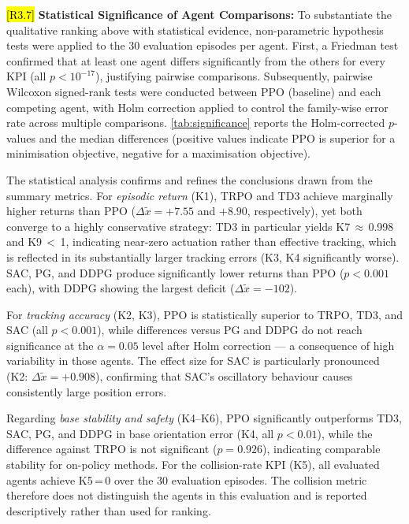 \documentclass{ieeeaccess}
\newcommand{\hlthree}[1]{{\sethlcolor{rthree}\hl{#1}}}
\newenvironment{rthreehl}
  {\def\FrameCommand{\colorbox{rthree}}\MakeFramed{\advance\hsize-\width\FrameRestore}}
  {\endMakeFramed}
\begin{document}
\begin{rthreehl}
\hlthree{[R3.7]} \textbf{Statistical Significance of Agent Comparisons:}
To substantiate the qualitative ranking above with statistical evidence, non-parametric
hypothesis tests were applied to the 30 evaluation episodes per agent.
First, a Friedman test confirmed that at least one agent differs significantly from the others for
every KPI (all $p < 10^{-17}$), justifying pairwise comparisons.
Subsequently, pairwise Wilcoxon signed-rank tests were conducted between PPO (baseline) and each
competing agent, with Holm correction applied to control the family-wise error rate across
multiple comparisons.
\autoref{tab:significance} reports the Holm-corrected $p$-values and the median differences %
(positive values indicate PPO is superior for a minimisation objective, negative for a
maximisation objective).

The statistical analysis confirms and refines the conclusions drawn from the summary metrics.
For \emph{episodic return} (K1), TRPO and TD3 achieve marginally higher returns than PPO
($\Delta\tilde{x}=+7.55$ and $+8.90$, respectively), yet both converge to a highly
conservative strategy: TD3 in particular yields K7\,$\approx$\,0.998 and K9\,$<$\,1,
indicating near-zero actuation rather than effective tracking, which is reflected in its
substantially larger tracking errors (K3, K4 significantly worse).
SAC, PG, and DDPG produce significantly lower returns than PPO ($p<0.001$ each), with DDPG
showing the largest deficit ($\Delta\tilde{x}=-102$).

For \emph{tracking accuracy} (K2, K3), PPO is statistically superior to TRPO, TD3, and SAC
(all $p<0.001$), while differences versus PG and DDPG do not reach significance at the
$\alpha=0.05$ level after Holm correction — a consequence of high variability in those agents.
The effect size for SAC is particularly pronounced (K2: $\Delta\tilde{x}=+0.908$), confirming
that SAC’s oscillatory behaviour causes consistently large position errors.

Regarding \emph{base stability and safety} (K4--K6), PPO significantly outperforms TD3, SAC,
PG, and DDPG in base orientation error (K4, all $p<0.01$), while the difference against TRPO
is not significant ($p=0.926$), indicating comparable stability for on-policy methods.
For the collision-rate KPI (K5), all evaluated agents achieve K5\,=\,0 over the 30 evaluation
episodes. The collision metric therefore does not distinguish the agents in this evaluation and is
reported descriptively rather than used for ranking.


\end{rthreehl}
\end{document}
